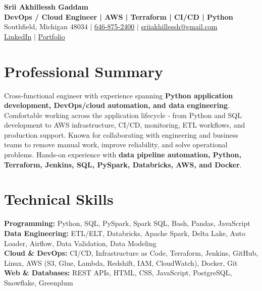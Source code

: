 \documentclass[letterpaper,10pt]{article}
\begin{document}
\fontsize{9.35pt}{10.45pt}\selectfont

\begin{center}
    {\LARGE \textbf{Srii Akhillessh Gaddam}} \\[-1pt]
    \textbf{DevOps / Cloud Engineer | AWS | Terraform | CI/CD | Python} \\[2pt]
    Southfield, Michigan 48034 $|$
    \href{tel:6468752400}{646-875-2400} $|$
    \href{mailto:sriiakhillessh@gmail.com}{sriiakhillessh@gmail.com} \\[1pt]
    \href{https://www.linkedin.com/in/srii-akhiilessh-gaddam-b48668191/}{LinkedIn} $|$
    \href{https://sriiakhillesshg.github.io/portfolio/}{Portfolio}
\end{center}
\vspace{-8pt}

\section{Professional Summary}
\small{Cross-functional engineer with experience spanning \textbf{Python application development, DevOps/cloud automation, and data engineering}. Comfortable working across the application lifecycle - from Python and SQL development to AWS infrastructure, CI/CD, monitoring, ETL workflows, and production support. Known for collaborating with engineering and business teams to remove manual work, improve reliability, and solve operational problems. Hands-on experience with \textbf{data pipeline automation, Python, Terraform, Jenkins, SQL, PySpark, Databricks, AWS, and Docker}.}

\section{Technical Skills}
\small{
\textbf{Programming:} Python, SQL, PySpark, Spark SQL, Bash, Pandas, JavaScript \\
\textbf{Data Engineering:} ETL/ELT, Databricks, Apache Spark, Delta Lake, Auto Loader, Airflow, Data Validation, Data Modeling \\
\textbf{Cloud \& DevOps:} CI/CD, Infrastructure as Code, Terraform, Jenkins, GitHub, Linux, AWS (S3, Glue, Lambda, Redshift, IAM, CloudWatch), Docker, Git \\
\textbf{Web \& Databases:} REST APIs, HTML, CSS, JavaScript, PostgreSQL, Snowflake, Greenplum
}
\end{document}

